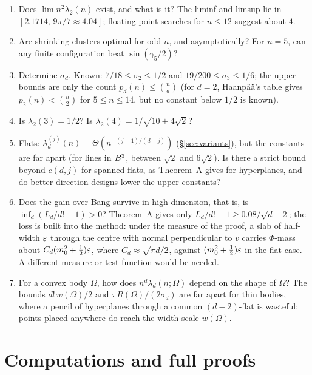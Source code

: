 \documentclass[11pt]{article}
\begin{document}
\begin{enumerate}
\item Does $\lim n^2\lambda_2(n)$ exist, and what is it? The liminf and limsup lie in
$[2.1714,\,9\pi/7\approx4.04]$; floating-point searches for $n\le12$ suggest about $4$.
\item Are shrinking clusters optimal for odd $n$, and asymptotically? For $n=5$, can any finite
configuration beat $\sin(\gamma_5/2)$?
\item Determine $\sigma_d$. Known: $7/18\le\sigma_2\le1/2$ and $19/200\le\sigma_3\le1/6$; the upper
bounds are only the count $p_d(n)\le\binom nd$ (for $d=2$, Haanpää's table gives $p_2(n)<\binom n2$ for $5\le n\le14$,
but no constant below $1/2$ is known).
\item Is $\lambda_2(3)=1/2$? Is $\lambda_2(4)=1/\sqrt{10+4\sqrt2}$?
\item Flats: $\lambda_d^{(j)}(n)=\Theta(n^{-(j+1)/(d-j)})$ (\S\ref{sec:variants}), but the constants are
far apart (for lines in $B^3$, between $\sqrt2$ and $6\sqrt2$). Is there a strict bound beyond
$c(d,j)$ for spanned flats, as Theorem~A gives for hyperplanes, and do better direction designs lower
the upper constants?
\item Does the gain over Bang survive in high dimension, that is, is $\inf_d(L_d/d!-1)>0$? Theorem~A
gives only $L_d/d!-1\ge0.08/\sqrt{d-2}$; the loss is built into the method: under the measure of the
proof, a slab of half-width $\varepsilon$ through the centre with normal perpendicular to $v$ carries
$\Phi$-mass about $C_d(m_0^2+\frac12)\varepsilon$, where $C_d\approx\sqrt{\pi d/2}$, against
$(m_0^2+\frac12)\varepsilon$ in the flat case. A different measure or test function would be needed.
\item For a convex body $\Omega$, how does $n^d\lambda_d(n;\Omega)$ depend on the shape of $\Omega$? The bounds
$d!\,w(\Omega)/2$ and $\pi R(\Omega)/(2\sigma_d)$ are far apart for thin bodies, where a pencil of hyperplanes
through a common $(d-2)$-flat is wasteful; points placed anywhere do reach the width scale $w(\Omega)$.
\end{enumerate}

\section*{Computations and full proofs}
\end{document}
